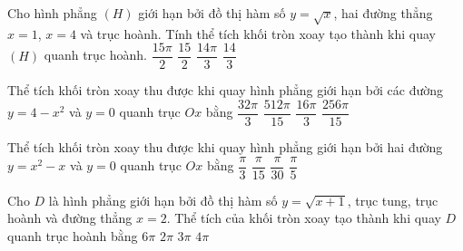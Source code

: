 \begin{ex}%
	Cho hình phẳng $(H)$ giới hạn bởi đồ thị hàm số $y=\sqrt{x}$, hai đường thẳng $x=1$, $x=4$ và trục hoành. Tính thể tích khối tròn xoay  tạo thành khi quay $(H)$ quanh trục hoành.
	 \choice
		 {\True $\dfrac{15\pi}{2}$}
		 {$\dfrac{15}{2}$}
		{$\dfrac{14\pi}{3}$} 
		 {$\dfrac{14}{3}$}
\end{ex}

\begin{ex}%
	Thể tích khối tròn xoay thu được khi quay hình phẳng giới hạn bởi các đường $y=4-x^2$ và $y=0$ quanh trục  $Ox$ bằng
	 \choice
		 {$\dfrac{32\pi}{3}$}
		{\True  $\dfrac{512\pi}{15}$}
		{$\dfrac{16\pi}{3}$} 
		{$\dfrac{256\pi}{15}$} 
\end{ex}

\begin{ex}%
	Thể tích khối  tròn xoay thu được khi quay hình phẳng giới hạn bởi hai đường $y=x^2-x$ và $y=0$ quanh trục $Ox$ bằng
	 \choice
		{$\dfrac{\pi}{3}$} 
		{$\dfrac{\pi}{15}$} 
		{\True $\dfrac{\pi}{30}$} 
		 {$\dfrac{\pi}{5}$}
\end{ex}

\begin{ex}%
	Cho $D$ là  hình phẳng giới hạn bởi đồ thị hàm số $y=\sqrt{x+1}$, trục tung, trục hoành và đường thẳng $x=2$. Thể tích của khối tròn xoay tạo thành khi quay $D$ quanh trục hoành bằng
	 \choice
		{$6\pi$} 
		 {$2\pi$}
		{$3\pi$} 
		{\True$4\pi$} 
\end{ex}

